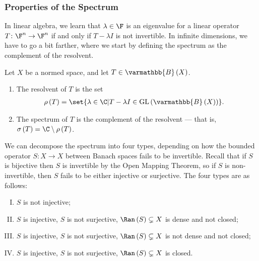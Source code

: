 \documentclass[10pt]{mypackage}
\renewcommand*{\mathbb}[1]{\varmathbb{#1}}
\newcommand{\B}{\mathbb{B}}
\begin{document}
\subsubsection{Properties of the Spectrum}%
In linear algebra, we learn that $\lambda \in \F$ is an eigenvalue for a linear operator $T\colon \F^n\rightarrow \F^n$ if and only if $T - \lambda I$ is not invertible. In infinite dimensions, we have to go a bit farther, where we start by defining the spectrum as the complement of the resolvent.
\begin{definition}
  Let $X$ be a normed space, and let $T\in \B\left(X\right)$.
  \begin{enumerate}[(1)]
    \item The resolvent of $T$ is the set
      \begin{align*}
        \rho\left(T\right) &= \set{\lambda\in \C | T - \lambda I \in \text{GL}\left(\B\left(X\right)\right)}.
      \end{align*}
    \item The spectrum of $T$ is the complement of the resolvent --- that is, $\sigma\left(T\right) = \C\setminus \rho\left(T\right)$.
  \end{enumerate}
\end{definition}
We can decompose the spectrum into four types, depending on how the bounded operator $S\colon X\rightarrow X$ between Banach spaces fails to be invertible. Recall that if $S$ is bijective then $S$ is invertible by the Open Mapping Theorem, so if $S$ is non-invertible, then $S$ fails to be either injective or surjective. The four types are as follows:
\begin{enumerate}[(I)]
  \item $S$ is not injective;
  \item $S$ is injective, $S$ is not surjective, $\Ran\left(S\right)\subsetneq X$ is dense and not closed;
  \item $S$ is injective, $S$ is not surjective, $\Ran\left(S\right)\subsetneq X$ is not dense and not closed;
  \item $S$ is injective, $S$ is not surjective, $\Ran\left(S\right)\subsetneq X$ is closed.
\end{enumerate}
\end{document}
